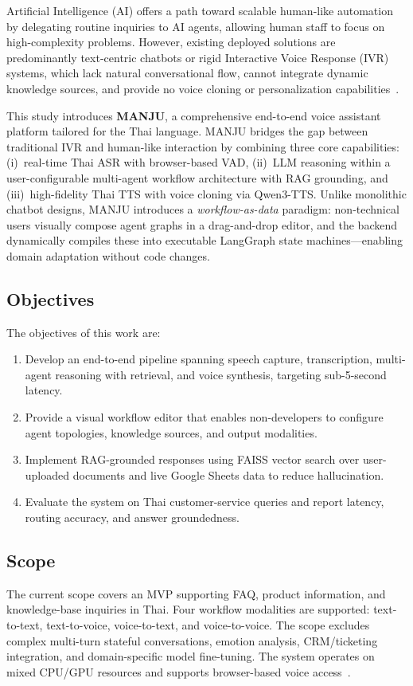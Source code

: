 \documentclass[10pt, a4paper, twocolumn]{article}
\begin{document}
Artificial Intelligence (AI) offers a path toward scalable human-like automation by delegating routine inquiries to AI agents, allowing human staff to focus on high-complexity problems.
However, existing deployed solutions are predominantly text-centric chatbots or rigid Interactive Voice Response (IVR) systems, which lack natural conversational flow, cannot integrate dynamic knowledge sources, and provide no voice cloning or personalization capabilities~\cite{manjuProgReport}.

This study introduces \textbf{MANJU}, a comprehensive end-to-end voice assistant platform tailored for the Thai language.
MANJU bridges the gap between traditional IVR and human-like interaction by combining three core capabilities: (i)~real-time Thai ASR with browser-based VAD, (ii)~LLM reasoning within a user-configurable multi-agent workflow architecture with RAG grounding, and (iii)~high-fidelity Thai TTS with voice cloning via Qwen3-TTS.
Unlike monolithic chatbot designs, MANJU introduces a \textit{workflow-as-data} paradigm: non-technical users visually compose agent graphs in a drag-and-drop editor, and the backend dynamically compiles these into executable LangGraph state machines---enabling domain adaptation without code changes.

\subsection{Objectives}
The objectives of this work are:
\begin{enumerate}[label=(\roman*)]
    \item Develop an end-to-end pipeline spanning speech capture, transcription, multi-agent reasoning with retrieval, and voice synthesis, targeting sub-5-second latency.
    \item Provide a visual workflow editor that enables non-developers to configure agent topologies, knowledge sources, and output modalities.
    \item Implement RAG-grounded responses using FAISS vector search over user-uploaded documents and live Google Sheets data to reduce hallucination.
    \item Evaluate the system on Thai customer-service queries and report latency, routing accuracy, and answer groundedness.
\end{enumerate}

\subsection{Scope}
The current scope covers an MVP supporting FAQ, product information, and knowledge-base inquiries in Thai.
Four workflow modalities are supported: text-to-text, text-to-voice, voice-to-text, and voice-to-voice.
The scope excludes complex multi-turn stateful conversations, emotion analysis, CRM/ticketing integration, and domain-specific model fine-tuning.
The system operates on mixed CPU/GPU resources and supports browser-based voice access~\cite{manjuProgReport}.
\end{document}
